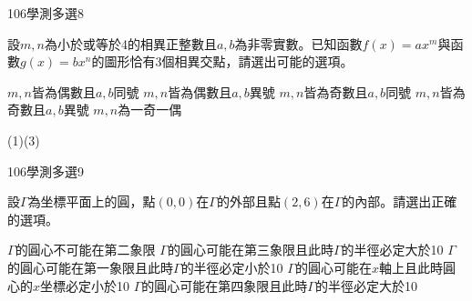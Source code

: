 \begin{QUESTIONS}
    \begin{QUESTION}
        \begin{ExamInfo}{106}{學測}{多選}{8}
        \end{ExamInfo}
        \begin{QBODY}
            設$m,n$為小於或等於4的相異正整數且$a,b$為非零實數。已知函數$f(x)=a{{x}^{m}}$與函數$g(x)=b{{x}^{n}}$的圖形恰有3個相異交點，請選出可能的選項。
        \begin{QOPS}
        \QOP $m,n$皆為偶數且$a,b$同號 
        \QOP $m,n$皆為偶數且$a,b$異號
        \QOP $m,n$皆為奇數且$a,b$同號
        \QOP $m,n$皆為奇數且$a,b$異號
        \QOP $m,n$為一奇一偶
        \end{QOPS}
        \end{QBODY}
        \begin{QFROMS}
        \end{QFROMS}
        \begin{QTAGS}
        \end{QTAGS}
        \begin{QANS}
            (1)(3)
        \end{QANS}
        \begin{QSOL}
        \end{QSOL}
        \begin{QEMPTYSPACE}
        \end{QEMPTYSPACE}
    \end{QUESTION}
    \begin{QUESTION}
        \begin{ExamInfo}{106}{學測}{多選}{9}
        \end{ExamInfo}
        \begin{QBODY}
            設$\Gamma $為坐標平面上的圓，點$(0,0)$在$\Gamma $的外部且點$(2,6)$在$\Gamma $的內部。請選出正確的選項。
        \begin{QOPS}
        \QOP $\Gamma $的圓心不可能在第二象限
        \QOP $\Gamma $的圓心可能在第三象限且此時$\Gamma $的半徑必定大於10
        \QOP $\Gamma $的圓心可能在第一象限且此時$\Gamma $的半徑必定小於10
        \QOP $\Gamma $的圓心可能在$x$軸上且此時圓心的$x$坐標必定小於10
        \QOP $\Gamma $的圓心可能在第四象限且此時$\Gamma $的半徑必定大於10
        \end{QOPS}
        \end{QBODY}
        \begin{QFROMS}
        \end{QFROMS}

\end{QUESTION}
\end{QUESTIONS}
